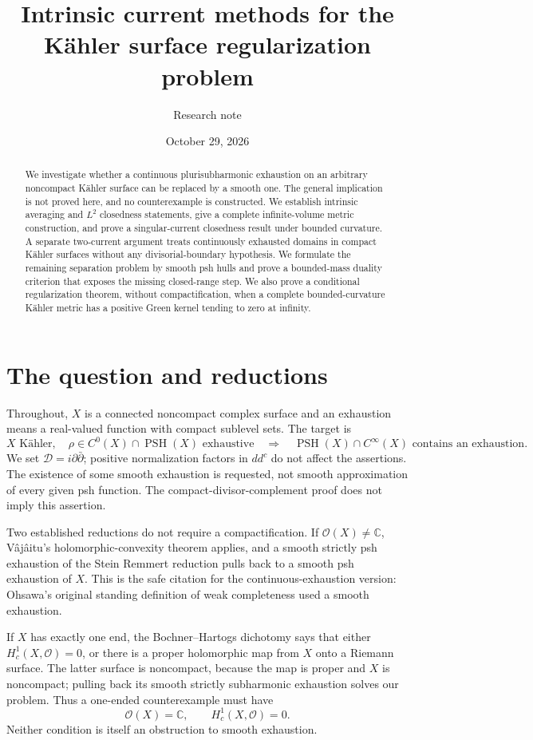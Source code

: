 \documentclass[11pt]{article}
\title{Intrinsic current methods for the K\"ahler surface regularization problem}
\author{Research note}
\date{October 29, 2026}
\theoremstyle{remark}
\newcommand{\D}{\mathcal D}
\begin{document}
\maketitle
\begin{abstract}
We investigate whether a continuous plurisubharmonic exhaustion on an arbitrary noncompact K\"ahler surface can be replaced by a smooth one. The general implication is not proved here, and no counterexample is constructed. We establish intrinsic averaging and $L^2$ closedness statements, give a complete infinite-volume metric construction, and prove a singular-current closedness result under bounded curvature. A separate two-current argument treats continuously exhausted domains in compact K\"ahler surfaces without any divisorial-boundary hypothesis. We formulate the remaining separation problem by smooth psh hulls and prove a bounded-mass duality criterion that exposes the missing closed-range step. We also prove a conditional regularization theorem, without compactification, when a complete bounded-curvature K\"ahler metric has a positive Green kernel tending to zero at infinity.
\end{abstract}

\section{The question and reductions}
Throughout, $X$ is a connected noncompact complex surface and an exhaustion means a real-valued function with compact sublevel sets. The target is
\[
 X\text{ K\"ahler},\quad \rho\in C^0(X)\cap\operatorname{PSH}(X)
 \text{ exhaustive}
 \quad\Longrightarrow\quad
 \operatorname{PSH}(X)\cap C^\infty(X)
 \text{ contains an exhaustion}.
\]
We set $\D=i\partial\bar\partial$; positive normalization factors in $dd^c$ do not affect the assertions. The existence of some smooth exhaustion is requested, not smooth approximation of every given psh function. The compact-divisor-complement proof does not imply this assertion.

Two established reductions do not require a compactification. If $\mathcal O(X)\ne\mathbb C$, V\^aj\^aitu's holomorphic-convexity theorem \cite[Theorem~1.1]{Vajaitu} applies, and a smooth strictly psh exhaustion of the Stein Remmert reduction pulls back to a smooth psh exhaustion of $X$. This is the safe citation for the continuous-exhaustion version: Ohsawa's original standing definition of weak completeness used a smooth exhaustion.

If $X$ has exactly one end, the Bochner--Hartogs dichotomy \cite[Theorem~2.5, case~(i)]{NR} says that either $H_c^1(X,\mathcal O)=0$, or there is a proper holomorphic map from $X$ onto a Riemann surface. The latter surface is noncompact, because the map is proper and $X$ is noncompact; pulling back its smooth strictly subharmonic exhaustion solves our problem. Thus a one-ended counterexample must have
\[
 \mathcal O(X)=\mathbb C,\qquad H_c^1(X,\mathcal O)=0.
\]
Neither condition is itself an obstruction to smooth exhaustion.
\end{document}
